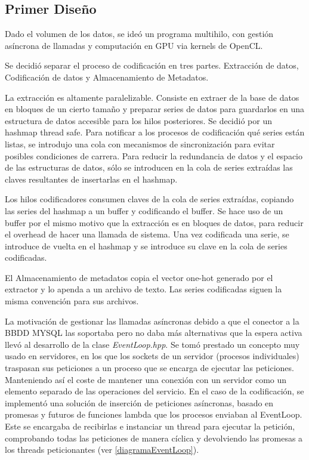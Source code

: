 \subsection{Primer Diseño}
Dado el volumen de los datos, se ideó un programa multihilo, con gestión asíncrona de llamadas y computación en GPU via kernels de OpenCL.

Se decidió separar el proceso de codificación en tres partes. Extracción de datos, Codificación de datos y Almacenamiento de Metadatos.

La extracción es altamente paralelizable. Consiste en extraer de la base de datos en bloques de un cierto tamaño y preparar series de datos para guardarlos en una estructura de datos accesible para los hilos posteriores. Se decidió por un hashmap thread safe.
Para notificar a los procesos de codificación qué series están listas, se introdujo una cola con mecanismos de sincronización para evitar posibles condiciones de carrera. Para reducir la redundancia de datos y el espacio de las estructuras de datos, sólo se introducen en la cola de series extraídas las claves resultantes de insertarlas en el hashmap.

Los hilos codificadores consumen claves de la cola de series extraídas, copiando las series del hashmap a un buffer y codificando el buffer. Se hace uso de un buffer por el mismo motivo que la extracción es en bloques de datos, para reducir el overhead de hacer una llamada de sistema. Una vez codificada una serie, se introduce de vuelta en el hashmap y se introduce su clave en la cola de series codificadas.

El Almacenamiento de metadatos copia el vector one-hot generado por el extractor y lo apenda a un archivo de texto. Las series codificadas siguen la misma convención para sus archivos. 


La motivación de gestionar las llamadas asíncronas debido a que el conector a la BBDD MYSQL las soportaba pero no daba más alternativas que la espera activa llevó al desarrollo de la clase \textit{EventLoop.hpp}. Se tomó prestado un concepto muy usado en servidores, en los que los sockets de un servidor (procesos individuales) traspasan sus peticiones a un proceso que se encarga de ejecutar las peticiones. Manteniendo así el coste de mantener una conexión con un servidor como un elemento separado de las operaciones del servicio. 
En el caso de la codificación, se implementó una solución de inserción de peticiones asíncronas, basado en promesas y futuros de funciones lambda que los procesos enviaban al EventLoop. Este se encargaba de recibirlas e instanciar un thread para ejecutar la petición, comprobando todas las peticiones de manera cíclica y devolviendo las promesas a los threads peticionantes (ver \ref{diagramaEventLoop}). 

